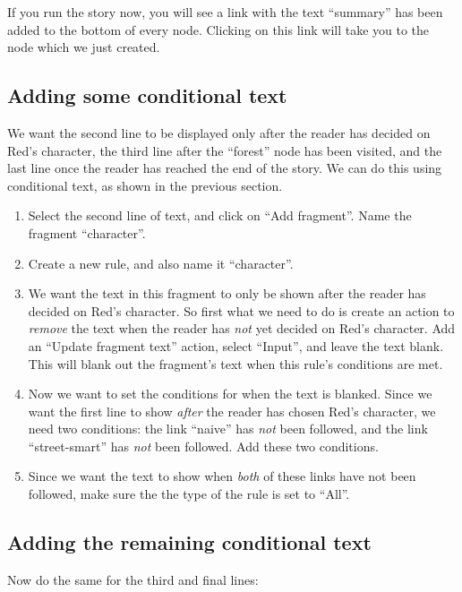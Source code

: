 \documentclass{article}
\begin{document}
If you run the story now, you will see a link with the text ``summary'' has been added to the bottom of every node. Clicking on this link will take you to the node which we just created.

\subsection{Adding some conditional text}
We want the second line to be displayed only after the reader has decided on Red's character, the third line after the ``forest'' node has been visited, and the last line once the reader has reached the end of the story. We can do this using conditional text, as shown in the previous section.

\begin{enumerate}
  \item Select the second line of text, and click on ``Add fragment''. Name the fragment ``character''.
  \item Create a new rule, and also name it ``character''.
  \item We want the text in this fragment to only be shown after the reader has decided on Red's character. So first what we need to do is create an action to \textit{remove} the text when the reader has \textit{not} yet decided on Red's character. Add an ``Update fragment text'' action, select ``Input'', and leave the text blank. This will blank out the fragment's text when this rule's conditions are met.
  
  \item Now we want to set the conditions for when the text is blanked. Since we want the first line to show \textit{after} the reader has chosen Red's character, we need two conditions: the link ``naive'' has \textit{not} been followed, and the link ``street-smart'' has \textit{not} been followed. Add these two conditions.
  \item Since we want the text to show when \textit{both} of these links have not been followed, make sure the the type of the rule is set to ``All''.
\end{enumerate}

\subsection{Adding the remaining conditional text}
Now do the same for the third and final lines:
\end{document}
